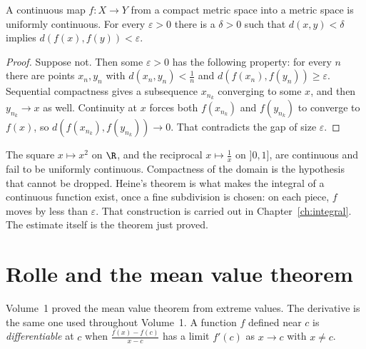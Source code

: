 \begin{theorem}[Heine]\label{thm:heine}
A continuous map $f:X\to Y$ from a compact metric space into a metric space is uniformly continuous. For every $\varepsilon>0$ there is a $\delta>0$ such that $d(x,y)<\delta$ implies $d(f(x),f(y))<\varepsilon$.
\end{theorem}
\begin{proof}
Suppose not. Then some $\varepsilon>0$ has the following property: for every $n$ there are points $x_n,y_n$ with $d(x_n,y_n)<\frac1n$ and $d(f(x_n),f(y_n))\ge\varepsilon$. Sequential compactness gives a subsequence $x_{n_k}$ converging to some $x$, and then $y_{n_k}\to x$ as well. Continuity at $x$ forces both $f(x_{n_k})$ and $f(y_{n_k})$ to converge to $f(x)$, so $d(f(x_{n_k}),f(y_{n_k}))\to0$. That contradicts the gap of size $\varepsilon$.
\end{proof}

The square $x\mapsto x^2$ on $\R$, and the reciprocal $x\mapsto\frac1x$ on $]0,1]$, are continuous and fail to be uniformly continuous. Compactness of the domain is the hypothesis that cannot be dropped. Heine's theorem is what makes the integral of a continuous function exist, once a fine subdivision is chosen: on each piece, $f$ moves by less than $\varepsilon$. That construction is carried out in Chapter~\ref{ch:integral}. The estimate itself is the theorem just proved.

\section{Rolle and the mean value theorem}

Volume~1 proved the mean value theorem from extreme values. The derivative is the same one used throughout Volume~1. A function $f$ defined near $c$ is \emph{differentiable} at $c$ when $\frac{f(x)-f(c)}{x-c}$ has a limit $f'(c)$ as $x\to c$ with $x\ne c$.

